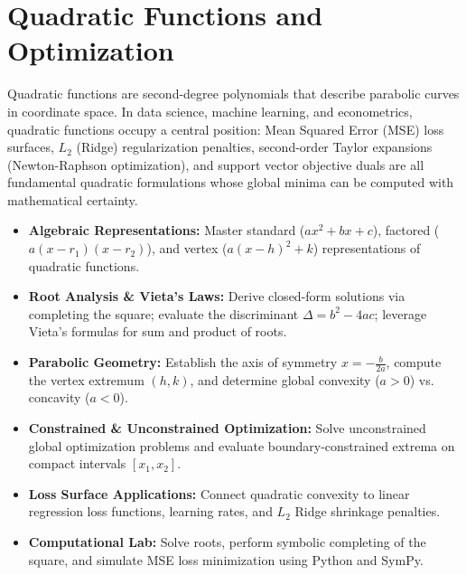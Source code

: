 \chapter{Quadratic Functions and Optimization}

Quadratic functions are second-degree polynomials that describe parabolic curves in coordinate space. In data science, machine learning, and econometrics, quadratic functions occupy a central position: Mean Squared Error (MSE) loss surfaces, $L_2$ (Ridge) regularization penalties, second-order Taylor expansions (Newton-Raphson optimization), and support vector objective duals are all fundamental quadratic formulations whose global minima can be computed with mathematical certainty.

\vspace{0.3cm}
\begin{tcolorbox}[colback=primarylight, colframe=primarydark, title={\textbf{Executive Roadmap \& Learning Objectives}}]
\begin{itemize}
    \item \textbf{Algebraic Representations:} Master standard ($ax^2 + bx + c$), factored ($a(x - r_1)(x - r_2)$), and vertex ($a(x - h)^2 + k$) representations of quadratic functions.
    \item \textbf{Root Analysis \& Vieta's Laws:} Derive closed-form solutions via completing the square; evaluate the discriminant $\Delta = b^2 - 4ac$; leverage Vieta's formulas for sum and product of roots.
    \item \textbf{Parabolic Geometry:} Establish the axis of symmetry $x = -\frac{b}{2a}$, compute the vertex extremum $(h, k)$, and determine global convexity ($a > 0$) vs. concavity ($a < 0$).
    \item \textbf{Constrained \& Unconstrained Optimization:} Solve unconstrained global optimization problems and evaluate boundary-constrained extrema on compact intervals $[x_1, x_2]$.
    \item \textbf{Loss Surface Applications:} Connect quadratic convexity to linear regression loss functions, learning rates, and $L_2$ Ridge shrinkage penalties.
    \item \textbf{Computational Lab:} Solve roots, perform symbolic completing of the square, and simulate MSE loss minimization using Python and SymPy.
\end{itemize}
\end{tcolorbox}
\vspace{0.3cm}

